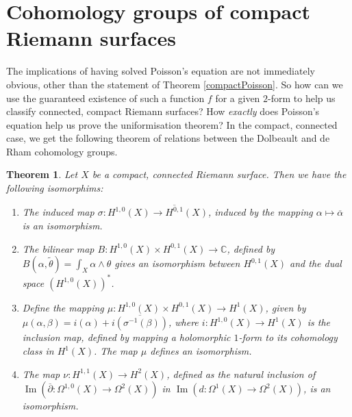 \documentclass[11pt]{report}
\newtheorem{thm}{Theorem}[section]
\theoremstyle{definition}
\DeclareMathOperator{\im}{Im}
\begin{document}
\section{Cohomology groups of compact Riemann surfaces}\label{noRiemannRoch}
The implications of having solved Poisson's equation are not immediately obvious, other than the statement of Theorem \ref{compactPoisson}. So how can we use the guaranteed existence of such a function $f$ for a given $2$-form to help us classify connected, compact Riemann surfaces? How \emph{exactly} does Poisson's equation help us prove the uniformisation theorem? In the compact, connected case, we get the following theorem of relations between the Dolbeault and de Rham cohomology groups.

\begin{thm}
  Let $X$ be a compact, connected Riemann surface. Then we have the following isomorphims:
  \begin{enumerate}
    \item The induced map $\sigma: H^{1,0}(X) \rightarrow \overline{H^{0,1}}(X)$, induced by the mapping $\alpha \mapsto \overline{\alpha}$ is an isomorphism.
    \item The bilinear map $B:H^{1,0}(X)\times H^{0,1}(X) \rightarrow \mathbb{C}$, defined by $B(\alpha, \tilde{\theta})=\int_X \alpha \wedge \theta$ gives an isomorphism between $H^{0,1}(X)$ and the dual space $(H^{1,0}(X))^*$.
    \item Define the mapping $\mu:H^{1,0}(X) \times H^{0,1}(X) \rightarrow H^1(X)$, given by $\mu(\alpha, \beta) = i(\alpha) + \overline{i(\sigma^{-1}(\beta))}$, where $i:H^{1,0}(X) \rightarrow H^1(X)$ is the inclusion map, defined by mapping a holomorphic $1$-form to its cohomology class in $H^1(X)$. The map $\mu$ defines an isomorphism.
    \item The map $\nu:H^{1,1}(X) \rightarrow H^2(X)$, defined as the natural inclusion of $\im(\overline{\partial}:\Omega^{1,0}(X)\rightarrow \Omega^2(X))$ in $\im(d:\Omega^1(X)\rightarrow \Omega^2(X))$, is an isomorphism.
  \end{enumerate}
\end{thm}
\end{document}
